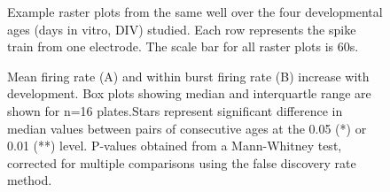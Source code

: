 \documentclass{article}
\begin{document}
\pagestyle{empty}


\makeatletter
\@fpsep\textheight
\makeatother

\begin{figure}
  \centering
  \caption{Example raster plots from the same well over the four
    developmental ages (days in vitro, DIV) studied. Each row
    represents the spike train from one electrode. The scale bar for
    all raster plots is 60s.}
\end{figure}

\begin{figure}
  \centering
  \caption{Mean firing rate (A) and within burst firing rate (B)
    increase with development.  Box plots showing median and
    interquartle range are shown for n=16 plates.Stars represent significant difference in median values between pairs of consecutive ages at the 0.05 (*) or 0.01 (**) level. P-values obtained from a Mann-Whitney test, corrected for multiple comparisons using the false discovery rate method.}
\end{figure}
\end{document}
